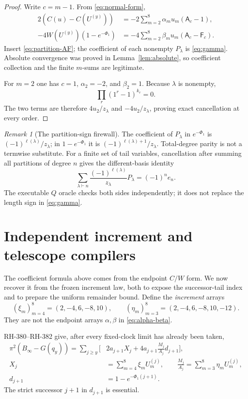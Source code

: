 \documentclass[11pt]{article}
\theoremstyle{definition}
\theoremstyle{remark}
\newtheorem{remark}[theorem]{Remark}
\newcommand{\ellp}{\ell}
\newcommand{\Afun}{\mathsf A}
\newcommand{\Ffun}{\mathsf F}
\begin{document}
\begin{proof}
Write $c=m-1$.  From \eqref{eq:normal-form},
\begin{align*}
 2(C(u)-C(U^{(y)}))
   &=-2\sum_{m=2}^8\alpha_mu_m(\Afun_c-1),\\
 -4W(U^{(y)})(1-e^{-\Phi_1})
   &=-4\sum_{m=2}^8\beta_mu_m(\Afun_c-\Ffun_c).
\end{align*}
Insert \eqref{eq:partition-AF}; the coefficient of each nonempty
$P_\lambda$ is \eqref{eq:gamma}.  Absolute convergence was proved in
Lemma~\ref{lem:absolute}, so coefficient collection and the finite
$m$-sums are legitimate.

For $m=2$ one has $c=1$, $\alpha_2=-2$, and $\beta_2=1$.  Because
$\lambda$ is nonempty,
\[
 \prod_r(1^r-1)^{k_r}=0.
\]
The two terms are therefore $4u_2/z_\lambda$ and
$-4u_2/z_\lambda$, proving exact cancellation at every order.
\end{proof}

\begin{remark}[The partition-sign firewall]
The coefficient of $P_\lambda$ in $e^{-\Phi_1}$ is
$(-1)^{\ellp(\lambda)}/z_\lambda$; in
$1-e^{-\Phi_1}$ it is
$(-1)^{\ellp(\lambda)+1}/z_\lambda$.  Total-degree parity is not a
termwise substitute.  For a finite set of tail variables, cancellation
after summing all partitions of degree $n$ gives the different-basis
identity
\[
 \sum_{\lambda\vdash n}\frac{(-1)^{\ellp(\lambda)}}{z_\lambda}P_\lambda
 =(-1)^ne_n.
\]
The executable $Q$ oracle checks both sides independently; it does not
replace the length sign in \eqref{eq:gamma}.
\end{remark}

\section{Independent increment and telescope compilers}

The coefficient formula above comes from the endpoint $C/W$ form.  We now
recover it from the frozen increment law, both to expose the successor-tail
index and to prepare the uniform remainder bound.  Define the \emph{increment}
arrays
\begin{equation}
 (\xi_m)_{m=4}^8=(2,-4,6,-8,10),\qquad
 (\eta_m)_{m=3}^8=(2,-4,6,-8,10,-12).
 \label{eq:xi-eta}
\end{equation}
They are not the endpoint arrays $\alpha,\beta$ in
\eqref{eq:alpha-beta}.

RH-380--RH-382 give, after every fixed-clock limit has already been taken,
\begin{equation}
\begin{aligned}
 \pi^2(B_\infty-G(q_y))
 =\sum_{j\ge y}\biggl[&2a_{j+1}X_j
 +4a_{j+1}\frac{M_j}{A_j}d_{j+1}\biggr],\\
 X_j&=\sum_{m=4}^8\xi_mU_m^{(j)},\qquad
 \frac{M_j}{A_j}=\sum_{m=3}^8\eta_mU_m^{(j)},\\
 d_{j+1}&=1-e^{-\Phi_1(j+1)}.
\end{aligned}
 \label{eq:increment}
\end{equation}
The strict successor $j+1$ in $d_{j+1}$ is essential.
\end{document}
